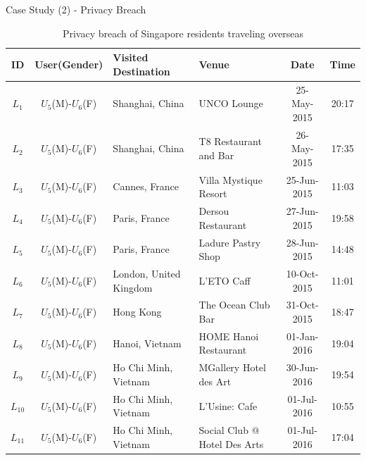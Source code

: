 \documentclass[
 size=14pt,
 paper=smartboard,  %
 mode=present, 		%
 display=slides, 	%
 style=tuliplab,  	%
 pauseslide,
 fleqn,leqno]{powerdot}{}
\begin{document}
\begin{slide}[toc=,bm=]{Case Study (2) - Privacy Breach}
\begin{table}
	\fontsize{11pt}{11pt}\selectfont
	\setlength{\abovecaptionskip}{0pt}
	\setlength{\belowcaptionskip}{12pt}
	\centering
	\caption{Privacy breach of Singapore residents traveling overseas}
	\begin{tabular}{c|c|l|l|c|c}	
	\toprule
	ID  	&  	\textbf{User(Gender)}		& 		\textbf{Visited Destination} 		& 		\textbf{Venue} 		& 	\textbf{Date} 		&	\textbf{Time}	\\
	\midrule
	$L_1$	&	$U_5$(M)-$U_6$(F)	&	Shanghai, China 	   &	UNCO Lounge		&	25-May-2015	&	20:17\\
	$L_2$	&	$U_5$(M)-$U_6$(F)	&	Shanghai, China 	   &	T8 Restaurant and Bar		&	26-May-2015	&	17:35\\
	$L_3$	&	$U_5$(M)-$U_6$(F)	&	Cannes, France 	       &	Villa Mystique Resort		&	25-Jun-2015	&	11:03\\	
	$L_4$	&	$U_5$(M)-$U_6$(F)	&	Paris, France 		   &	Dersou Restaurant			&	27-Jun-2015	&	19:58\\
	$L_5$	&	$U_5$(M)-$U_6$(F)	&	Paris, France 		   &	Ladure Pastry Shop			&	28-Jun-2015	&	14:48\\
	$L_6$	&	$U_5$(M)-$U_6$(F)	&	London, United Kingdom &	L'ETO Caff			&	10-Oct-2015	&	11:01\\
	$L_7$	&	$U_5$(M)-$U_6$(F)	&	Hong Kong		       &	The Ocean Club Bar			&	31-Oct-2015	&	18:47\\
	$L_8$	&	$U_5$(M)-$U_6$(F)	&	Hanoi, Vietnam		   &	HOME Hanoi Restaurant			&	01-Jan-2016	&	19:04\\
	$L_9$	&	$U_5$(M)-$U_6$(F)	&	Ho Chi Minh, Vietnam   &	MGallery Hotel des Art		&	30-Jun-2016	&	19:54\\
	$L_{10}$	&	$U_5$(M)-$U_6$(F)	&	Ho Chi Minh, Vietnam   &	L'Usine: Cafe		&	01-Jul-2016	&	10:55\\
	$L_{11}$	&	$U_5$(M)-$U_6$(F)	&	Ho Chi Minh, Vietnam   &	Social Club @ Hotel Des Arts		&	01-Jul-2016	&	17:04\\
	\bottomrule
	\end{tabular}	
\end{table}


\end{slide}
\end{document}
